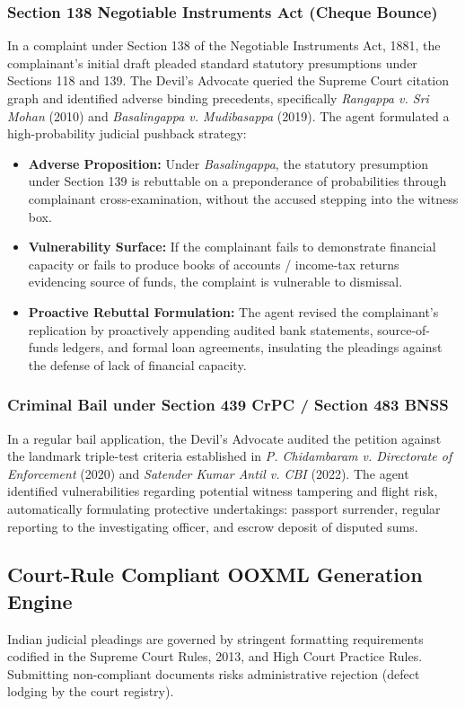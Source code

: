 \documentclass[conference]{IEEEtran}
\begin{document}
\subsubsection{Section 138 Negotiable Instruments Act (Cheque Bounce)}
In a complaint under Section 138 of the Negotiable Instruments Act, 1881, the complainant's initial draft pleaded standard statutory presumptions under Sections 118 and 139. The Devil's Advocate queried the Supreme Court citation graph and identified adverse binding precedents, specifically \emph{Rangappa v. Sri Mohan} (2010) and \emph{Basalingappa v. Mudibasappa} (2019). The agent formulated a high-probability judicial pushback strategy:
\begin{itemize}
    \item \textbf{Adverse Proposition:} Under \emph{Basalingappa}, the statutory presumption under Section 139 is rebuttable on a preponderance of probabilities through complainant cross-examination, without the accused stepping into the witness box.
    \item \textbf{Vulnerability Surface:} If the complainant fails to demonstrate financial capacity or fails to produce books of accounts / income-tax returns evidencing source of funds, the complaint is vulnerable to dismissal.
    \item \textbf{Proactive Rebuttal Formulation:} The agent revised the complainant's replication by proactively appending audited bank statements, source-of-funds ledgers, and formal loan agreements, insulating the pleadings against the defense of lack of financial capacity.
\end{itemize}

\subsubsection{Criminal Bail under Section 439 CrPC / Section 483 BNSS}
In a regular bail application, the Devil's Advocate audited the petition against the landmark triple-test criteria established in \emph{P. Chidambaram v. Directorate of Enforcement} (2020) and \emph{Satender Kumar Antil v. CBI} (2022). The agent identified vulnerabilities regarding potential witness tampering and flight risk, automatically formulating protective undertakings: passport surrender, regular reporting to the investigating officer, and escrow deposit of disputed sums.

\subsection{Court-Rule Compliant OOXML Generation Engine}
Indian judicial pleadings are governed by stringent formatting requirements codified in the Supreme Court Rules, 2013, and High Court Practice Rules. Submitting non-compliant documents risks administrative rejection (defect lodging by the court registry).
\end{document}
